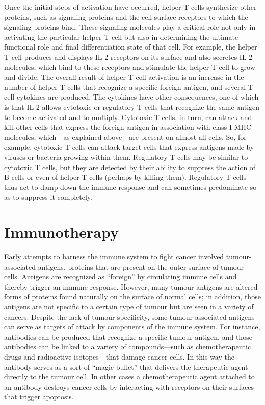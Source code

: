 Once the initial steps of activation have occurred, helper T cells synthesize other proteins, such as signaling proteins and the cell-surface receptors to which the signaling proteins bind. These signaling molecules play a critical role not only in activating the particular helper T cell but also in determining the ultimate functional role and final differentiation state of that cell. For example, the helper T cell produces and displays IL-2 receptors on its surface and also secretes IL-2 molecules, which bind to these receptors and stimulate the helper T cell to grow and divide.
The overall result of helper-T-cell activation is an increase in the number of helper T cells that recognize a specific foreign antigen, and several T-cell cytokines are produced. The cytokines have other consequences, one of which is that IL-2 allows cytotoxic or regulatory T cells that recognize the same antigen to become activated and to multiply. Cytotoxic T cells, in turn, can attack and kill other cells that express the foreign antigen in association with class I MHC molecules, which—as explained above—are present on almost all cells. So, for example, cytotoxic T cells can attack target cells that express antigens made by viruses or bacteria growing within them. Regulatory T cells may be similar to cytotoxic T cells, but they are detected by their ability to suppress the action of B cells or even of helper T cells (perhaps by killing them). Regulatory T cells thus act to damp down the immune response and can sometimes predominate so as to suppress it completely.

\section{Immunotherapy}
Early attempts to harness the immune system to fight cancer involved tumour-associated antigens, proteins that are present on the outer surface of tumour cells. Antigens are recognized as “foreign” by circulating immune cells and thereby trigger an immune response. However, many tumour antigens are altered forms of proteins found naturally on the surface of normal cells; in addition, those antigens are not specific to a certain type of tumour but are seen in a variety of cancers. Despite the lack of tumour specificity, some tumour-associated antigens can serve as targets of attack by components of the immune system. For instance, antibodies can be produced that recognize a specific tumour antigen, and those antibodies can be linked to a variety of compounds—such as chemotherapeutic drugs and radioactive isotopes—that damage cancer cells. In this way the antibody serves as a sort of “magic bullet” that delivers the therapeutic agent directly to the tumour cell. In other cases a chemotherapeutic agent attached to an antibody destroys cancer cells by interacting with receptors on their surfaces that trigger apoptosis.

